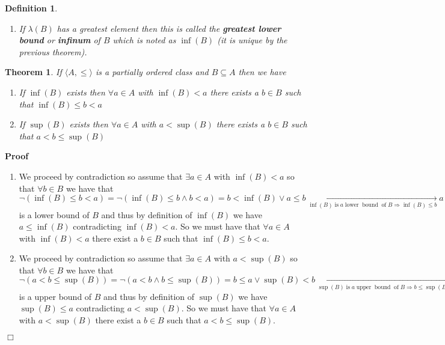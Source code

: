 \documentclass{book}
\newcommand{\Rightarrowlim}{\mathop{\rightarrow}\limits}
\newcommand{\tmop}[1]{\ensuremath{\operatorname{#1}}}
\newcommand{\tmtextbf}[1]{{\bfseries{#1}}}
\newenvironment{proof}{\noindent\textbf{Proof\ }}{\hspace*{\fill}$\Box$\medskip}
\newtheorem{definition}{Definition}
{\theorembodyfont{\rmfamily}\newtheorem{example}{Example}}
\newtheorem{theorem}{Theorem}
\begin{document}
{{\begin{definition}
\begin{enumerate}
    \item If $\lambda (B)$ has a greatest element then this is called the
    \tmtextbf{greatest lower bound} or \tmtextbf{infinum} of $B$ which is
    noted as $\inf (B)$ (it is unique by the previous theorem).
  \end{enumerate}
\end{definition}

\begin{theorem}
  \label{property of inf and sup}If $\langle A, \leqslant \rangle$ is a
  partially ordered class and $B \subseteq A$ then we have
  \begin{enumerate}
    \item If $\inf (B)$ exists then $\forall a \in A$ with $\inf (B) < a$
    there exists a $b \in B$ such that $\inf (B) \leqslant b < a$
    
    \item If $\sup (B)$ exists then $\forall a \in A$ with $a < \sup (B)$
    there exists a $b \in B$ such that $a < b \leqslant \sup (B)$
  \end{enumerate}
\end{theorem}

\begin{proof}
  
  \begin{enumerate}
    \item We proceed by contradiction so assume that $\exists a \in A$ with
    $\inf (B) < a$ so that $\forall b \in B$ we have that $\neg (\inf (B)
    \leqslant b < a) = \neg (\inf (B) \leqslant b \wedge b < a) = b < \inf (B)
    \vee a \leqslant b \Rightarrowlim_{\inf (B) \tmop{is} a \tmop{lower}
    \tmop{bound} \tmop{of} B \Rightarrow \inf (B) \leqslant b} a \leqslant b
    \Rightarrow a$ is a lower bound of $B$ and thus by definition of $\inf
    (B)$ we have $a \leqslant \inf (B)$ contradicting $\inf (B) < a$. So we
    must have that $\forall a \in A$ with $\inf (B) < a$ there exist a $b \in
    B$ such that $\inf (B) \leqslant b < a$.
    
    \item We proceed by contradiction so assume that $\exists a \in A$ with $a
    < \sup (B)$ so that $\forall b \in B$ we have that $\neg (a < b \leqslant
    \sup (B)) = \neg (a < b \wedge b \leqslant \sup (B)) = b \leqslant a \vee
    \sup (B) < b \Rightarrowlim_{\sup (B) \tmop{is} a \tmop{upper}
    \tmop{bound} \tmop{of} B \Rightarrow b \leqslant \sup (B)} b \leqslant a
    \Rightarrow a$ is a upper bound of $B$ and thus by definition of $\sup
    (B)$ we have $\sup (B) \leqslant a$ contradicting $a < \sup (B)$. So we
    must have that $\forall a \in A$ with $a < \sup (B)$ there exist a $b \in
    B$ such that $a < b \leqslant \sup (B)$.
  \end{enumerate}
\end{proof}

}}
\end{document}
